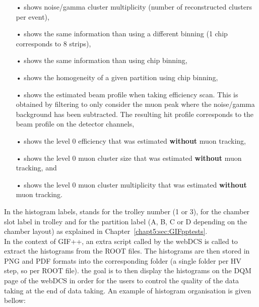\begin{itemize}
		\item[•]  shows noise/gamma cluster multiplicity (number of reconstructed clusters per event),
		\item[•]  shows the same information than  using a different binning (1 chip corresponds to 8 strips),
		\item[•]  shows the same information than  using chip binning,
		\item[•]  shows the homogeneity of a given partition using chip binning,
		\item[•]  shows the estimated beam profile when taking efficiency scan. This is obtained by filtering  to only consider the muon peak where the noise/gamma background has been subtracted. The resulting hit profile corresponds to the beam profile on the detector channels,
		\item[•]  shows the level 0 efficiency that was estimated \textbf{without} muon tracking,
		\item[•]  shows the level 0 muon cluster size that was estimated \textbf{without} muon tracking, and
		\item[•]  shows the level 0 muon cluster multiplicity that was estimated \textbf{without} muon tracking.
	\end{itemize}

	In the histogram labels,  stands for the trolley number (1 or 3),  for the chamber slot label in trolley   and  for the partition label (A, B, C or D depending on the chamber layout) as explained in Chapter~\ref{chapt5:sec:GIFpptests}.\\
	
	In the context of GIF++, an extra script called by the webDCS is called to extract the histograms from the ROOT files. The histograms are then stored in PNG and PDF formats into the corresponding folder (a single folder per HV step, so per ROOT file). the goal is to then display the histograms on the \acf{DQM} page of the webDCS in order for the users to control the quality of the data taking at the end of data taking. An example of histogram organisation is given bellow:\\
	
